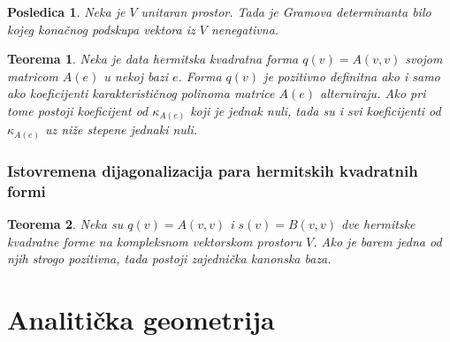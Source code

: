 \documentclass[a4paper,12pt,twoside]{report}
\newtheorem{theorem}{Teorema}[section]
\newtheorem{corollary}{Posledica}[theorem]
\numberwithin{algorithm}{section}
\begin{document}
\begin{corollary}
    Neka je $V$ unitaran prostor. Tada je Gramova determinanta bilo kojeg konačnog podskupa vektora iz $V$ nenegativna.
\end{corollary}

\begin{theorem}
    Neka je data hermitska kvadratna forma $q(v) = A(v, v)$ svojom matricom $A(e)$ u nekoj bazi $e$. Forma $q(v)$ je pozitivno definitna ako i samo ako 
    koeficijenti karakterističnog polinoma matrice $A(e)$ alterniraju. Ako pri tome postoji koeficijent od $\kappa_{A(e)}$ koji je jednak nuli, tada su i svi
    koeficijenti od $\kappa_{A(e)}$ uz niže stepene jednaki nuli.
\end{theorem}

\subsection{Istovremena dijagonalizacija para hermitskih kvadratnih formi}

\begin{theorem}
    Neka su $q(v) = A(v, v)$ i $s(v) = B(v, v)$ dve hermitske kvadratne forme na kompleksnom vektorskom prostoru $V$. Ako je barem jedna od njih strogo pozitivna, 
    tada postoji zajednička kanonska baza. 
\end{theorem}

\chapter{Analitička geometrija}
\end{document}
